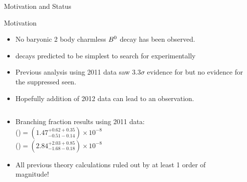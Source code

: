 \documentclass{beamer}
\begin{document}
\begin{frame}{ Motivation and Status}
  \begin{block}{Motivation}
    \begin{itemize}
    \item No baryonic 2 body charmless $B^{0}$ decay has been observed.
    \item {} decays predicted to be simplest to search for experimentally
    \end{itemize}
  \end{block}
  \begin{itemize}
  \item Previous analysis using 2011 data saw $3.3\sigma$ evidence for \decay{\Bd}{\proton\antiproton} but no evidence for the suppressed \decay{\Bs}{\proton\antiproton} seen.
  \item Hopefully addition of 2012 data can lead to an observation.
  \end{itemize}
  \begin{columns}
    \begin{column}{0.65\textwidth}
      \begin{itemize}
      \item Branching fraction results using 2011 data: \\
        \BF(\decay{\Bd}{\proton\antiproton})$ = (1.47^{+0.62+0.35}_{-0.51-0.14})\times 10^{-8}$\\
        \BF(\decay{\Bs}{\proton \antiproton})$ = (2.84^{+2.03 +0.85}_{-1.68 -0.18}) \times 10^{-8}$
      \item All previous theory calculations ruled out by at least 1 order of magnitude!
      \end{itemize}
    \end{column}
    \begin{column}{0.34\textwidth}

\end{column}
\end{columns}
\end{frame}
\end{document}
